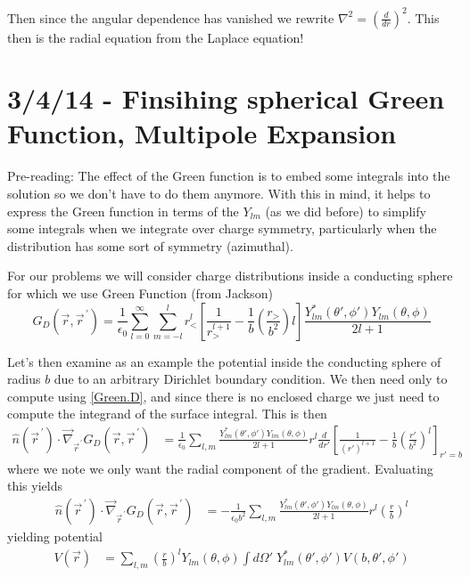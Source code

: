 \documentclass[10pt]{report}
\newcommand{\rd}[2]{\frac{d#1}{d#2}}
\newcommand{\pvec}[1]{\vec{#1}^{\,\prime}}
\newcommand{\grad}[0]{\vec{\nabla}}
\begin{document}
Then since the angular dependence has vanished we rewrite $\nabla^2 = \left( \rd{}{r} \right)^2$. This then is the radial equation from the Laplace equation!
\chapter{3/4/14 - Finsihing spherical Green Function, Multipole Expansion}

Pre-reading: The effect of the Green function is to embed some integrals into the solution so we don't have to do them anymore. With this in mind, it helps to express the Green function in terms of the $Y_{lm}$ (as we did before) to simplify some integrals when we integrate over charge symmetry, particularly when the distribution has some sort of symmetry (azimuthal). 

For our problems we will consider charge distributions inside a conducting sphere for which we use Green Function (from Jackson)
\begin{equation}
    G_D(\vec{r}, \pvec{r}) = \frac{1}{\epsilon_0} \sum_{l=0}^{\infty}\sum_{m=-l}^{l} r^l_< \left[ \frac{1}{r_>^{l+1}} - \frac{1}{b}\left( \frac{r_>}{b^2} \right)l \right]\frac{Y_{lm}^*(\theta', \phi')Y_{lm}(\theta,\phi)}{2l+1}
\end{equation}

Let's then examine as an example the potential inside the conducting sphere of radius $b$ due to an arbitrary Dirichlet boundary condition. We then need only to compute using \eqref{Green.D}, and since there is no enclosed charge we just need to compute the integrand of the surface integral. This is then
\begin{align}
    \hat{n}(\pvec{r})\cdot \grad_{\pvec{r}}G_D(\vec{r}, \pvec{r}) &= \frac{1}{\epsilon_0}\sum_{l,m}^{}\frac{Y_{lm}^*(\theta', \phi')Y_{lm}(\theta,\phi)}{2l+1}r^l \rd{}{r'}\left[ \frac{1}{(r')^{l+1}}- \frac{1}{b}\left( \frac{r'}{b^2} \right)^l \right]_{r' = b}
\end{align}
where we note we only want the radial component of the gradient. Evaluating this yields
\begin{align}
    \hat{n}(\pvec{r})\cdot \grad_{\pvec{r}}G_D(\vec{r}, \pvec{r}) &= -\frac{1}{\epsilon_0b^2}\sum_{l,m}^{}\frac{Y_{lm}^*(\theta', \phi')Y_{lm}(\theta,\phi)}{2l+1}r^l \left( \frac{r}{b} \right)^l
\end{align}
yielding potential
\begin{align}
    V(\vec{r}) &= \sum_{l,m}^{}\left( \frac{r}{b} \right)^lY_{lm}(\theta,\phi)\int d\Omega'\; Y_{lm}^*(\theta', \phi')V(b, \theta', \phi')
\end{align}
\end{document}
